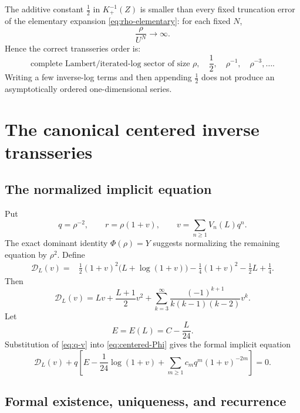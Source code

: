 \documentclass[11pt,a4paper]{article}
\numberwithin{equation}{section}
\theoremstyle{remark}
\begin{document}
\begin{warningbox}
The additive constant \(\tfrac12\) in \(K_+^{-1}(Z)\) is smaller than every
fixed truncation error of the elementary expansion \cref{eq:rho-elementary}:
for each fixed \(N\),
\[
\frac{\rho}{U^N}\longrightarrow\infty.
\]
Hence the correct transseries order is:
\[
\text{complete Lambert/iterated-log sector of size }\rho,
\quad \frac12,
\quad \rho^{-1},\quad \rho^{-3},\ldots.
\]
Writing a few inverse-log terms and then appending \(\tfrac12\) does not
produce an asymptotically ordered one-dimensional series.
\end{warningbox}

\section{The canonical centered inverse transseries}
\label{sec:canonical}

\subsection{The normalized implicit equation}

Put
\begin{equation}
q=\rho^{-2},
\qquad
r=\rho(1+v),
\qquad
v=\sum_{n\ge1}V_n(L)q^n.
\label{eq:q-v}
\end{equation}
The exact dominant identity \(\Phi(\rho)=Y\) suggests normalizing the
remaining equation by \(\rho^2\).  Define
\begin{align}
\mathcal D_L(v)
={}&\frac12(1+v)^2\bigl(L+\log(1+v)\bigr)
-\frac14(1+v)^2-\frac12L+\frac14.
\label{eq:D-L}
\end{align}
Then
\begin{equation}
\mathcal D_L(v)
=Lv+\frac{L+1}{2}v^2+
\sum_{k=3}^{\infty}
\frac{(-1)^{k+1}}{k(k-1)(k-2)}v^k.
\label{eq:D-expansion}
\end{equation}
Let
\begin{equation}
E=E(L)=C-\frac{L}{24}.
\label{eq:E}
\end{equation}
Substitution of \cref{eq:q-v} into \cref{eq:centered-Phi} gives the formal
implicit equation
\begin{equation}
\boxed{
\mathcal D_L(v)+q\left[
E-\frac1{24}\log(1+v)+
\sum_{m\ge1}c_m q^m(1+v)^{-2m}
\right]=0.
}
\label{eq:canonical-implicit}
\end{equation}

\subsection{Formal existence, uniqueness, and recurrence}
\end{document}
